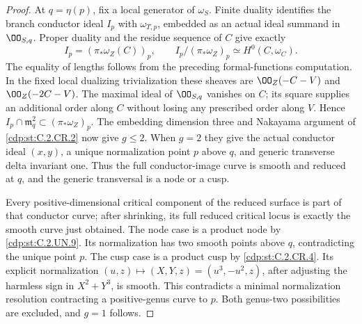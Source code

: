 \begin{proof}
At $q=\eta(p)$, fix a local generator of $\omega_S$.
Finite duality identifies the branch conductor
ideal $I_p$ with $\omega_{T,p}$, embedded as an
actual ideal summand in $\OO_{S,q}$. Proper
duality and the residue sequence of $C$ give
exactly
\[
 I_p=(\pi_*\omega_Z(C))_p,\qquad
 I_p/(\pi_*\omega_Z)_p\simeq H^0(C,\omega_C).
 \tag{C.UNCR.3}\label{cdp:eq:C.UNCR.3}
\]
The equality of lengths follows from the preceding
formal-functions computation. In the fixed local
dualizing trivialization these sheaves are
$\OO_Z(-C-V)$ and $\OO_Z(-2C-V)$.
The maximal ideal of $\OO_{S,q}$ vanishes on $C$;
its square supplies an additional order along
$C$ without losing any prescribed order along
$V$. Hence
$I_p\cap\mathfrak m_q^2\subset(\pi_*\omega_Z)_p$.
The embedding dimension three and Nakayama
argument of \ref{cdp:st:C.2.CR.2} now give $g\le2$. When
$g=2$ they give the actual conductor ideal
$(x,y)$, a unique normalization point $p$ above
$q$, and generic transverse delta invariant
one. Thus the full conductor-image curve is
smooth and reduced at $q$, and the generic
transversal is a node or a cusp.

Every positive-dimensional critical component
of the reduced surface is part of that conductor
curve; after shrinking, its full reduced critical
locus is exactly the smooth curve just obtained.
The node case is a product node by \ref{cdp:st:C.2.UN.9}.
Its normalization has two smooth points above
$q$, contradicting the unique point $p$.
The cusp case is a product cusp by \ref{cdp:st:C.2.CR.4}.
Its explicit normalization
$(u,z)\mapsto(X,Y,z)=(u^3,-u^2,z)$, after
adjusting the harmless sign in $X^2+Y^3$,
is smooth. This contradicts a minimal
normalization resolution contracting a
positive-genus curve to $p$. Both genus-two
possibilities are excluded, and $g=1$ follows.
\end{proof}


